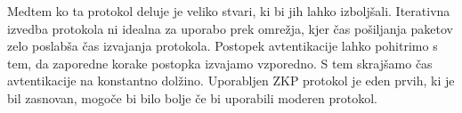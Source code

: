 %

Medtem ko ta protokol deluje je veliko stvari, ki bi jih lahko izboljšali.
Iterativna izvedba protokola ni idealna za uporabo prek omrežja, kjer čas pošiljanja paketov zelo poslabša čas izvajanja protokola.
Postopek avtentikacije lahko pohitrimo s tem, da zaporedne korake postopka izvajamo vzporedno. S tem skrajšamo čas avtentikacije na konstantno dolžino.
Uporabljen ZKP protokol je eden prvih, ki je bil zasnovan, mogoče bi bilo bolje če bi uporabili moderen protokol.






